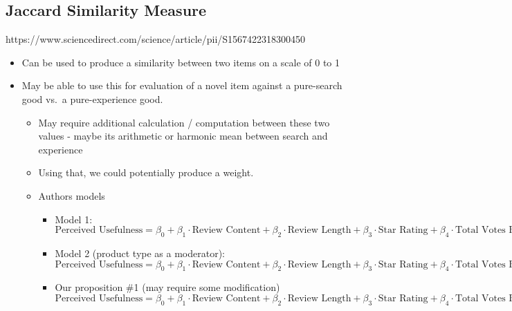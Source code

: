 \documentclass[
  letterpaper,
  DIV=11,
  numbers=noendperiod]{scrreprt}
\begin{document}
\subsection{Jaccard Similarity
Measure}\label{jaccard-similarity-measure}

https://www.sciencedirect.com/science/article/pii/S1567422318300450

\begin{itemize}
\item
  Can be used to produce a similarity between two items on a scale of 0
  to 1
\item
  May be able to use this for evaluation of a novel item against a
  pure-search good vs.~a pure-experience good.

  \begin{itemize}
  \item
    May require additional calculation / computation between these two
    values - maybe its arithmetic or harmonic mean between search and
    experience
  \item
    Using that, we could potentially produce a weight.
  \item
    Authors models

    \begin{itemize}
    \item
      Model 1:
      \(\text{Perceived Usefulness} = \beta_0 + \beta_1 \cdot \text{Review Content} + \beta_2 \cdot \text{Review Length} + \beta_3\cdot \text{Star Rating} + \beta_4 \cdot \text{Total Votes Received} + \epsilon_1\)
    \item
      Model 2 (product type as a moderator):
      \(\text{Perceived Usefulness} = \beta_0 + \beta_1 \cdot \text{Review Content} + \beta_2 \cdot \text{Review Length} + \beta_3\cdot \text{Star Rating} + \beta_4 \cdot \text{Total Votes Received} + \beta_5 \cdot \text{Digital Music} + \beta_6 \cdot \text{Video Game} + \beta_7 \cdot \text{Review Content}\cdot \text{ Digital Music} + \beta_8\cdot\text{Review Content}\cdot\text{ Video Game} + \epsilon_2\)
    \item
      Our proposition \#1 (may require some modification) \[
      \text{Perceived Usefulness} = \beta_0 + \beta_1 \cdot \text{Review Content} + \beta_2 \cdot \text{Review Length} + \beta_3\cdot \text{Star Rating} + \beta_4 \cdot \text{Total Votes Received} + \gamma\cdot\text{Review Content}
      \]
    \end{itemize}
  \end{itemize}
\end{itemize}
\end{document}
